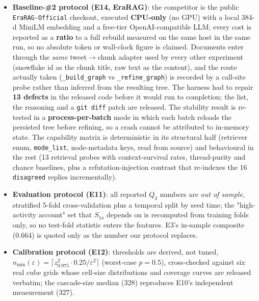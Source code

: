 \begin{itemize}
\item \textbf{Baseline-\#2 protocol (E14, EraRAG)}: the competitor is the public \texttt{EraRAG-Official} checkout, executed \textbf{CPU-only} (no GPU) with a local 384-d MiniLM embedding and a free-tier OpenAI-compatible LLM; every cost is reported as a \textbf{ratio} to a full rebuild measured on the same host in the same run, so no absolute token or wall-clock figure is claimed. Documents enter through the \emph{same} tweet$\to$chunk adapter used by every other experiment (snowflake id as the chunk title, raw text as the content), and the route actually taken (\texttt{\_build\_graph} vs \texttt{\_refine\_graph}) is recorded by a call-site probe rather than inferred from the resulting tree. The harness had to repair \textbf{13 defects} in the released code before it would run to completion; the list, the reasoning and a \texttt{git diff} patch are released. The stability result is re-tested in a \textbf{process-per-batch} mode in which each batch reloads the persisted tree before refining, so a crash cannot be attributed to in-memory state. The capability matrix is deterministic in its structural half (retriever enum, \texttt{mode\_list}, node-metadata keys, read from source) and behavioural in the rest (13 retrieval probes with context-survival rates, thread-purity and chance baselines, plus a refutation-injection contrast that re-indexes the 16 \texttt{disagreed} replies incrementally).
\item \textbf{Evaluation protocol (E11)}: all reported $Q_3$ numbers are \emph{out of sample}, stratified 5-fold cross-validation plus a temporal split by seed time; the "high-activity account" set that $S_{1a}$ depends on is recomputed from training folds only, so no test-fold statistic enters the features. E3's in-sample composite (0.664) is quoted only as the number our protocol replaces.
\item \textbf{Calibration protocol (E12)}: thresholds are derived, not tuned, $n_{\min}(\varepsilon)=\lceil z^2_{0.975}\cdot 0.25/\varepsilon^2\rceil$ (worst-case $p=0.5$), cross-checked against six real cube grids whose cell-size distributions and coverage curves are released verbatim; the cascade-size median (328) reproduces E10's independent measurement (327).

\end{itemize}
